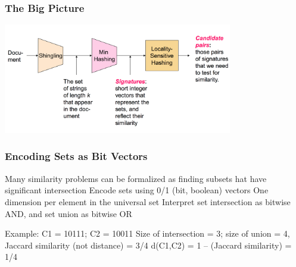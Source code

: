 \documentclass[svgnames]{beamer}
\begin{document}
  
\begin{frame} \frametitle{The Big Picture}

\includegraphics[width=10cm]{overall}

\end{frame}

  
\begin{frame} \frametitle{Encoding Sets as Bit Vectors}

Many similarity problems can be formalized as finding subsets hat have significant intersection
  Encode sets using 0/1 (bit, boolean) vectors
  One dimension per element in the universal set
  Interpret set intersection as bitwise AND, and set union as bitwise OR

Example: C1 = 10111; C2 = 10011
  Size of intersection = 3; size of union = 4, Jaccard similarity (not distance) = 3/4
  d(C1,C2) = 1 – (Jaccard similarity) = 1/4
  
\end{frame}

  
\end{document}
